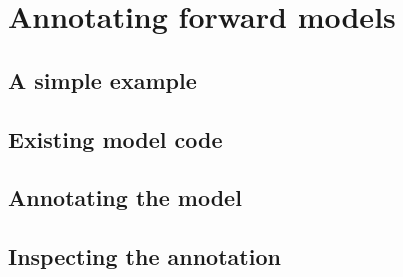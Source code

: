 \chapter{Annotating forward models}

\begin{synopsis}
\end{synopsis}
\minitoc
\vspace{\fill}
\newpage

\section{A simple example}
\section{Existing model code}
\section{Annotating the model}
\section{Inspecting the annotation}

